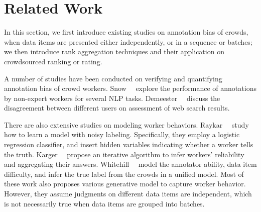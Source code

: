 

\section{Related Work}
\label{sec:related}


In this section, we first introduce existing studies on annotation bias of crowds, 
when data items are presented either independently, or in a sequence or batches; 
we then introduce rank aggregation techniques and their application on crowdsourced ranking or rating.  



A number of studies have been conducted on verifying and quantifying annotation bias of crowd workers.  
Snow~\etal~\cite{snow:emnlp2008} explore the performance of annotations by non-expert workers for several NLP tasks.
Demeester~\etal~\cite{demeester:wsdm2014} discuss the disagreement between different users on assessment of web search results.

There are also extensive studies on modeling worker behaviors.  
Raykar~\etal~\cite{raykar:nips2011ranking,raykar:icml2009,raykar:jmlr2010}
study how to learn a model with noisy labeling. 
Specifically, they employ a logistic regression classifier, 
and insert hidden variables indicating whether a worker tells the truth. 
Karger~\etal~\cite{karger:nips2011} propose an iterative algorithm to infer workers' reliability 
and aggregating their answers.  
Whitehill~\etal~\cite{whitehill:nips2009} model the annotator ability, data item difficulty, and infer the true label from the crowds in a unified model.
Most of these work also proposes various generative model to capture worker behavior.  
However, they assume judgments on different data items are independent, 
which is not necessarily true when data items are grouped into batches.  

